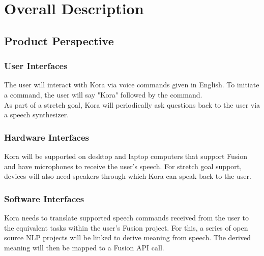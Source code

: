\documentclass[onecolumn, draftclsnofoot,10pt, compsoc]{IEEEtran}
\def \botname{Kora\xspace}
\begin{document}
\section{Overall Description}
    \subsection{Product Perspective}

        \subsubsection{User Interfaces}
            The user will interact with \botname via voice commands given in English. 
            To initiate a command, the user will say "\botname" followed by the command. \\

            As part of a stretch goal, \botname will periodically ask questions back to the user via a speech synthesizer.

        \subsubsection{Hardware Interfaces} 
            \botname will be supported on desktop and laptop computers that support Fusion and have microphones to receive the user's speech.
            For stretch goal support, devices will also need speakers through which \botname can speak back to the user.

        \subsubsection{Software Interfaces}               
            \botname needs to translate supported speech commands received from the user to the equivalent tasks within the user's Fusion project.
            For this, a series of open source NLP projects will be linked to derive meaning from speech.
            The derived meaning will then be mapped to a Fusion API call.
\end{document}
